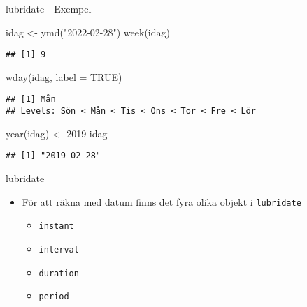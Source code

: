 \documentclass[
  11pt,
  ignorenonframetext,
  handout]{beamer}
\newenvironment{Shaded}{\begin{snugshade}}{\end{snugshade}}
\newcommand{\AttributeTok}[1]{\textcolor[rgb]{0.77,0.63,0.00}{#1}}
\newcommand{\ConstantTok}[1]{\textcolor[rgb]{0.00,0.00,0.00}{#1}}
\newcommand{\DecValTok}[1]{\textcolor[rgb]{0.00,0.00,0.81}{#1}}
\newcommand{\FunctionTok}[1]{\textcolor[rgb]{0.00,0.00,0.00}{#1}}
\newcommand{\NormalTok}[1]{#1}
\newcommand{\OtherTok}[1]{\textcolor[rgb]{0.56,0.35,0.01}{#1}}
\newcommand{\StringTok}[1]{\textcolor[rgb]{0.31,0.60,0.02}{#1}}
\providecommand{\tightlist}{%
  \setlength{\itemsep}{0pt}\setlength{\parskip}{0pt}}
\begin{document}
\begin{frame}[fragile]{lubridate - Exempel}
\protect\hypertarget{lubridate---exempel-1}{}
\begin{Shaded}
\begin{Highlighting}[]
\NormalTok{idag }\OtherTok{\textless{}{-}} \FunctionTok{ymd}\NormalTok{(}\StringTok{"2022{-}02{-}28"}\NormalTok{)}
\FunctionTok{week}\NormalTok{(idag)}
\end{Highlighting}
\end{Shaded}

\begin{verbatim}
## [1] 9
\end{verbatim}

\begin{Shaded}
\begin{Highlighting}[]
\FunctionTok{wday}\NormalTok{(idag, }\AttributeTok{label =} \ConstantTok{TRUE}\NormalTok{)}
\end{Highlighting}
\end{Shaded}

\begin{verbatim}
## [1] Mån
## Levels: Sön < Mån < Tis < Ons < Tor < Fre < Lör
\end{verbatim}

\begin{Shaded}
\begin{Highlighting}[]
\FunctionTok{year}\NormalTok{(idag) }\OtherTok{\textless{}{-}} \DecValTok{2019}
\NormalTok{idag}
\end{Highlighting}
\end{Shaded}

\begin{verbatim}
## [1] "2019-02-28"
\end{verbatim}
\end{frame}

\begin{frame}{lubridate}
\protect\hypertarget{lubridate-3}{}
\begin{itemize}
\tightlist
\item
  För att räkna med datum finns det fyra olika objekt i
  \texttt{lubridate}

  \begin{itemize}
  \tightlist
  \item
    \texttt{instant}
  \item
    \texttt{interval}
  \item
    \texttt{duration}
  \item
    \texttt{period}
  \end{itemize}
\end{itemize}
\end{frame}
\end{document}
